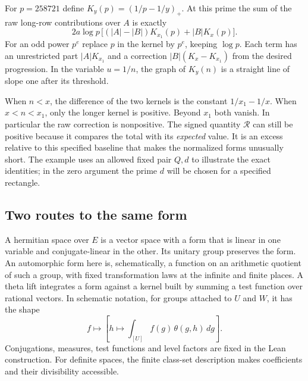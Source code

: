 \documentclass[11pt,letterpaper]{article}
\begin{document}
For \(p=258721\) define \(K_y(p)=(1/p-1/y)_+\). At this prime the sum of the raw long-row contributions over \(A\) is exactly
\[
  2a\log p\,\bigl[(|A|-|B|)K_{x_1}(p)+|B|K_x(p)\bigr].
\]
For an odd power \(p^e\) replace \(p\) in the kernel by \(p^e\), keeping \(\log p\). Each term has an unrestricted part \(|A|K_{x_1}\) and a correction \(|B|(K_x-K_{x_1})\) from the desired progression. In the variable \(u=1/n\), the graph of \(K_y(n)\) is a straight line of slope one after its threshold.
\begin{center}
\end{center}
When \(n<x\), the difference of the two kernels is the constant \(1/x_1-1/x\). When \(x<n<x_1\), only the longer kernel is positive. Beyond \(x_1\) both vanish. In particular the raw correction is nonpositive. The signed quantity \(\mathcal R\) can still be positive because it compares the total with its \emph{expected} value. It is an excess relative to this specified baseline that makes the normalized forms unusually short. The example uses an allowed fixed pair \(Q,d\) to illustrate the exact identities; in the zero argument the prime \(d\) will be chosen for a specified rectangle.

\subsection{Two routes to the same form}
A hermitian space over \(E\) is a vector space with a form that is linear in one variable and conjugate-linear in the other. Its unitary group preserves the form. An automorphic form here is, schematically, a function on an arithmetic quotient of such a group, with fixed transformation laws at the infinite and finite places. A theta lift integrates a form against a kernel built by summing a test function over rational vectors. In schematic notation, for groups attached to \(U\) and \(W\), it has the shape
\[
             f\longmapsto \left[h\longmapsto
                 \int_{[U]} f(g)\,\theta(g,h)\,dg\right].
\]
Conjugations, measures, test functions and level factors are fixed in the Lean construction. For definite spaces, the finite class-set description makes coefficients and their divisibility accessible.
\end{document}

